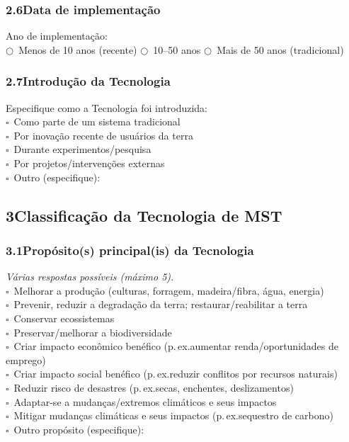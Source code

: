 \subsubsection*{2.6\quad Data de implementação}

Ano de implementação: \dotfill\\
$\bigcirc$~Menos de 10 anos (recente) \quad $\bigcirc$~10--50 anos \quad $\bigcirc$~Mais de 50 anos (tradicional)

\subsubsection*{2.7\quad Introdução da Tecnologia}

Especifique como a Tecnologia foi introduzida:\\
$\square$~Como parte de um sistema tradicional\\
$\square$~Por inovação recente de usuários da terra\\
$\square$~Durante experimentos/pesquisa\\
$\square$~Por projetos/intervenções externas\\
$\square$~Outro (especifique): \dotfill

\subsection*{3\quad Classificação da Tecnologia de MST}

\subsubsection*{3.1\quad Propósito(s) principal(is) da Tecnologia}
\textit{Várias respostas possíveis (máximo 5).}\\[4pt]
$\square$~Melhorar a produção (culturas, forragem, madeira/fibra, água, energia)\\
$\square$~Prevenir, reduzir a degradação da terra; restaurar/reabilitar a terra\\
$\square$~Conservar ecossistemas\\
$\square$~Preservar/melhorar a biodiversidade\\
$\square$~Criar impacto econômico benéfico (p.\,ex.\@ aumentar renda/oportunidades de emprego)\\
$\square$~Criar impacto social benéfico (p.\,ex.\@ reduzir conflitos por recursos naturais)\\
$\square$~Reduzir risco de desastres (p.\,ex.\@ secas, enchentes, deslizamentos)\\
$\square$~Adaptar-se a mudanças/extremos climáticos e seus impactos\\
$\square$~Mitigar mudanças climáticas e seus impactos (p.\,ex.\@ sequestro de carbono)\\
$\square$~Outro propósito (especifique): \dotfill

